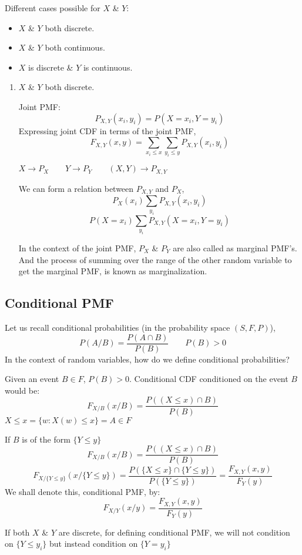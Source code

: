 \documentclass{article}
\begin{document}
Different cases possible for $X$ \& $Y$:
\begin{itemize}
    \item $X$ \& $Y$ both discrete.
    \item $X$ \& $Y$ both continuous.
    \item $X$ is discrete \& $Y$ is continuous.
\end{itemize}

\begin{enumerate}
    \item $X$ \& $Y$ both discrete.
    
    Joint PMF:
    $$ P_{X,Y}(x_i,y_i)= P(X= x_i,Y= y_i)$$
    Expressing joint CDF in terms of the joint PMF,
    $$ F_{X,Y}(x,y) = \sum_{x_i \leq x} \sum_{y_i \leq y} P_{X,Y}(x_i,y_i)$$

    $X\to P_X \qquad Y \to P_Y \qquad (X,Y) \to P_{X,Y}$

    We can form a relation between $P_{X,Y}$ and $P_X$,
    $$ P_X(x_i) \sum_{y_i} P_{X,Y}(x_i,y_i)$$
    $$ P(X= x_i) \sum_{y_i} P_{X,Y}(X=x_i,Y=y_i)$$

    In the context of the joint PMF, $P_X$ \& $P_Y$ are also called as marginal PMF's.
    And the process of summing over the range of the other random variable to get the marginal PMF, is known as marginalization.
\end{enumerate}

\subsection{Conditional PMF}

Let us recall conditional probabilities (in the probability space $(S,F,P)$),
$$ P(A/B)= \frac{P(A \cap B)}{P(B)} \qquad P(B)>0$$
In the context of random variables, how do we define conditional probabilities?

Given an event $B \in F$, $P(B)>0$. Conditional CDF conditioned on the event $B$ would be:
$$ F_{X/B}(x/B)= \frac{P( (X \leq x)\cap B)}{P(B)}$$
$X \leq x= \{ w: X(w) \leq x\}= A \in F$

If $B$ is of the form $\{ Y \leq y \}$
$$ F_{X/B}(x/B)= \frac{P((X \leq x) \cap B)}{P(B)}$$
$$ F_{X/\{ Y \leq y \}}(x / \{ Y \leq y \})= \frac{P(\{ X \leq x \} \cap \{ Y \leq y \})}{P(\{ Y \leq y \})}= \frac{F_{X,Y}(x,y)}{F_Y (y)}$$
We shall denote this, conditional PMF, by:
$$ F_{X/Y}(x/y)= \frac{F_{X,Y}(x,y)}{F_Y (y)}$$

If both $X$ \& $Y$ are discrete, for defining conditional PMF, we will not condition on $\{ Y \leq y_i \} $ but instead condition on $\{ Y = y_i \}$
\end{document}
